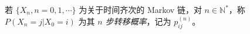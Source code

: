 \documentclass[../main.tex]{subfiles}
\begin{document}
\begin{definition}\label{def:7.2.1}
    若 $\{X_n,n=0,1,\cdots\}$ 为关于时间齐次的 Markov 链，对 $n\in\mathbb N^*$，称 $P(X_n=j|X_0=i)$ 为其 \emph{$n$ 步转移概率}，记为 $p_{ij}^{(n)}$。
\end{definition}
\end{document}
